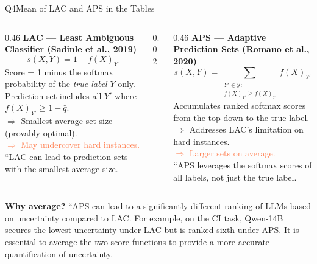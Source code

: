 \documentclass[aspectratio=169,10pt]{beamer}
\newcommand{\hruleslide}{%
  \vspace{0.15em}{\color{Rule}\hrule height 0.4pt}\vspace{0.3em}}
\begin{document}
\begin{frame}{Q4\enspace Mean of LAC and APS in the Tables}


\vspace{0.1em}
\begin{columns}[T]
  \begin{column}{0.46\textwidth}
    {\small\bfseries\color{darkred}LAC — Least Ambiguous Classifier \normalfont\small(Sadinle et al., 2019)}
    \hruleslide
    \[s(X,Y)=1-f(X)_Y\]
    {\footnotesize
      Score = 1 minus the softmax probability of the \emph{true label} $Y$ only.\\[4pt]
      Prediction set includes all $Y'$ where $f(X)_{Y'}\!\geq\!1-\hat{q}$.\\[4pt]
      \textcolor{GreenOk}{$\Rightarrow$ Smallest average set size (provably optimal).}\\
      \textcolor{Coral}{$\Rightarrow$ May undercover hard instances.}\\[4pt]
      \textcolor{Slate}{\small``LAC can lead to prediction sets with the smallest average size.}
    }
  \end{column}

  \begin{column}{0.02\textwidth}\color{Rule}\vrule\end{column}

  \begin{column}{0.46\textwidth}
    {\small\bfseries\color{darkred}APS — Adaptive Prediction Sets \normalfont\small(Romano et al., 2020)}
    \hruleslide
    \[s(X,Y)=\!\!\sum_{\substack{Y'\in\mathcal{Y}:\\f(X)_{Y'}\geq f(X)_Y}}\!\!f(X)_{Y'}\]
    {\footnotesize
      Accumulates ranked softmax scores from the top down to the true label.\\[4pt]
      \textcolor{GreenOk}{$\Rightarrow$ Addresses LAC's limitation on hard instances.}\\
      \textcolor{Coral}{$\Rightarrow$ Larger sets on average.}\\[4pt]
      \textcolor{Slate}{\small``APS leverages the softmax scores of all labels, not just the true label.}
    }
  \end{column}
\end{columns}

\vspace{0.55em}\hruleslide

{\footnotesize\bfseries\color{darkred}Why average?}\enspace
{\footnotesize\color{Slate}
  ``APS can lead to a significantly different ranking of LLMs based on uncertainty compared to LAC.
  For example, on the CI task, Qwen-14B secures the lowest uncertainty under LAC but is ranked sixth under APS.
  It is essential to average the two score functions to provide a more accurate quantification of uncertainty.}
\end{frame}
\end{document}
